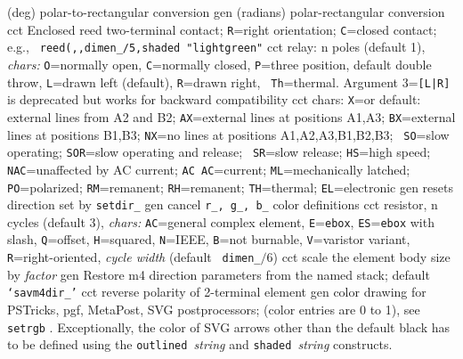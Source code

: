   {(deg) polar-to-rectangular conversion}
  {gen}
  {(radians) polar-rectangular conversion}
  {cct}
  {Enclosed reed two-terminal contact;
   {\tt R}=right orientation; {\tt C}=closed contact; e.g., {\tt
   reed(,,dimen\_/5,shaded "lightgreen"} }
  {cct}
  {relay: n poles (default 1), {\sl chars:} {\tt O}=normally open,
    {\tt C}=normally closed, {\tt P}=three position, default double
    throw, {\tt L}=drawn left (default), {\tt R}=drawn right, {\tt
    Th}=thermal.  Argument 3={\tt [L|R]} is deprecated but works for
    backward compatibility
   }
  {cct}
  {chars:
    {\tt X}=or default: external lines from A2 and B2; {\tt AX}=external
    lines at positions A1,A3; {\tt BX}=external lines at positions
    B1,B3; {\tt NX}=no lines at positions A1,A2,A3,B1,B2,B3; {\tt
    SO}=slow operating; {\tt SOR}=slow operating and release; {\tt
    SR}=slow release; {\tt HS}=high speed; {\tt NAC}=unaffected by AC
    current; {\tt AC AC}=current; {\tt ML}=mechanically latched; {\tt
    PO}=polarized; {\tt RM}=remanent; {\tt RH}=remanent; {\tt TH}=thermal;
    {\tt EL}=electronic
   }
  {gen}
  {resets direction set by {\tt setdir\_}}
  {gen}
  {cancel {\tt r\_, g\_, b\_} color definitions}
  {cct}
  {resistor, n cycles (default 3), {\sl chars:}
    {\tt AC}=general complex element,
    {\tt E}={\tt ebox}, {\tt ES}={\tt ebox} with slash, {\tt Q}=offset,
    {\tt H}=squared, {\tt N}=IEEE, {\tt B}=not burnable, {\tt V}=varistor
    variant, {\tt R}=right-oriented, {\sl cycle width} (default {\tt
    dimen\_}$/6$) }
  {cct}
  {scale the element body size by {\sl factor}}
  {gen}
  {Restore m4 direction parameters from the named stack;
    default {\tt `savm4dir\_'}}
  {cct}
  {reverse polarity of 2-terminal element}
  {gen}
  {color drawing for PSTricks, pgf, MetaPost, SVG postprocessors;
   (color entries are 0 to 1),
   see {\tt setrgb} .  Exceptionally, the color
   of SVG arrows other than the default black has to be defined using the
   {\tt outlined }{\sl string} and {\tt shaded }{\sl string} constructs.}
